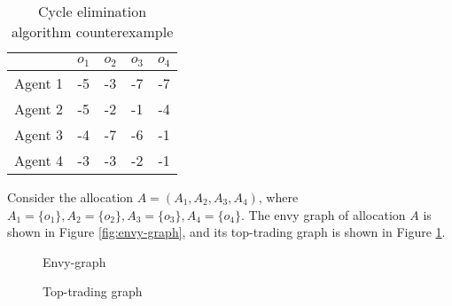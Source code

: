 \documentclass[sigconf]{aamas}
\theoremstyle{definition}
\begin{document}
\begin{table}[]
    \caption{Cycle elimination algorithm counterexample}
    \label{tab:CycleElimination}
    \centering
    \begin{tabular}{||c | c c c c ||} 
    \hline
    {} & {$o_1$} & {$o_2$} & {$o_3$} & {$o_4$} \\ [0.5ex] 
    \hline\hline
    Agent 1 & -5 & -3 & -7 & -7 \\
    \hline
    Agent 2 & -5 & -2 & -1 & -4 \\ 
    \hline
    Agent 3 & -4 & -7 & -6 & -1 \\ 
    \hline
    Agent 4 & -3 & -3 & -2 & -1 \\ 
    \hline
    \end{tabular} 
\end{table}

Consider the allocation $A=(A_1,A_2,A_3,A_4)$, where $A_1=\{o_1\},A_2=\{o_2\},A_3=\{o_3\},A_4=\{o_4\}$. 
The envy graph of allocation $A$ is  shown in Figure \ref{fig:envy-graph}, and its top-trading graph is shown in Figure \ref{fig:top-trading-graph}.

\begin{figure}[!htb]
\begin{minipage}{0.20\textwidth}
    \centering
    \caption{Envy-graph}
    \label{fig:envy-graph}
\end{minipage}\hfill
\begin{minipage}{0.22\textwidth}
    \centering
    \caption{Top-trading graph}
    \label{fig:top-trading-graph}
   \end{minipage}
\end{figure}
\end{document}
